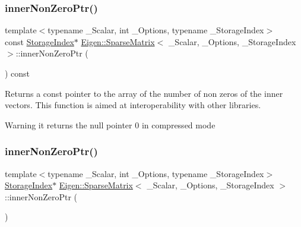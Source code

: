 \subsubsection{\texorpdfstring{innerNonZeroPtr()}{innerNonZeroPtr()}\hspace{0.1cm}{\footnotesize\ttfamily [1/2]}}
{\footnotesize\ttfamily template$<$typename \+\_\+\+Scalar, int \+\_\+\+Options, typename \+\_\+\+Storage\+Index$>$ \\
const \mbox{\hyperlink{class_eigen_1_1_sparse_matrix_base_a0b540ba724726ebe953f8c0df06081ed}{Storage\+Index}}$\ast$ \mbox{\hyperlink{class_eigen_1_1_sparse_matrix}{Eigen\+::\+Sparse\+Matrix}}$<$ \+\_\+\+Scalar, \+\_\+\+Options, \+\_\+\+Storage\+Index $>$\+::inner\+Non\+Zero\+Ptr (\begin{DoxyParamCaption}{ }\end{DoxyParamCaption}) const\hspace{0.3cm}{\ttfamily [inline]}}

\begin{DoxyReturn}{Returns}
a const pointer to the array of the number of non zeros of the inner vectors. This function is aimed at interoperability with other libraries. 
\end{DoxyReturn}
\begin{DoxyWarning}{Warning}
it returns the null pointer 0 in compressed mode 
\end{DoxyWarning}
\mbox{\label{class_eigen_1_1_sparse_matrix_a00efb5c30c29bbc826d156d97e60d870}} 
\subsubsection{\texorpdfstring{innerNonZeroPtr()}{innerNonZeroPtr()}\hspace{0.1cm}{\footnotesize\ttfamily [2/2]}}
{\footnotesize\ttfamily template$<$typename \+\_\+\+Scalar, int \+\_\+\+Options, typename \+\_\+\+Storage\+Index$>$ \\
\mbox{\hyperlink{class_eigen_1_1_sparse_matrix_base_a0b540ba724726ebe953f8c0df06081ed}{Storage\+Index}}$\ast$ \mbox{\hyperlink{class_eigen_1_1_sparse_matrix}{Eigen\+::\+Sparse\+Matrix}}$<$ \+\_\+\+Scalar, \+\_\+\+Options, \+\_\+\+Storage\+Index $>$\+::inner\+Non\+Zero\+Ptr (\begin{DoxyParamCaption}{ }\end{DoxyParamCaption})\hspace{0.3cm}{\ttfamily [inline]}}

